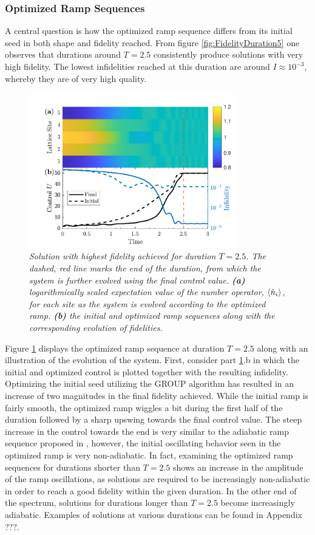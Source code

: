 \subsubsection{Optimized Ramp Sequences}
A central question is how the optimized ramp sequence differs from its initial seed in both shape and fidelity reached. From figure \ref{fig:FidelityDuration5} one observes that durations around $T = 2.5$ consistently produce solutions with very high fidelity. The lowest infidelities reached at this duration are around $I \approx 10^{-3}$, whereby they are of very high quality. 
\begin{figure}[h!]
    \centering
    \includegraphics[width=0.8\textwidth]{Figures/5part/ExtendedRampT25.pdf}
    \caption{\textit{Solution with highest fidelity achieved for duration $T = 2.5$. The dashed, red line marks the end of the duration, from which the system is further evolved using the final control value. \textbf{(a)} logarithmically scaled expectation value of the number operator, $\braket{\hat{n}_i}$, for each site as the system is evolved according to the optimized ramp. \textbf{(b)} the initial and optimized ramp sequences along with the corresponding evolution of fidelities.}}
    \label{fig:ExtendedRamp5}
\end{figure}
Figure \ref{fig:ExtendedRamp5} displays the optimized ramp sequence at duration $T = 2.5$ along with an illustration of the evolution of the system. First, consider part \ref{fig:ExtendedRamp5}.b in which the initial and optimized control is plotted together with the resulting infidelity. Optimizing the initial seed utilizing the GROUP algorithm has resulted in an increase of two magnitudes in the final fidelity achieved.
While the initial ramp is fairly smooth, the optimized ramp wiggles a bit during the first half of the duration followed by a sharp upswing towards the final control value. The steep increase in the control towards the end is very similar to the adiabatic ramp sequence proposed in \cite{Zakrzewski2009}, however, the initial oscillating behavior seen in the optimized ramp is very non-adiabatic. In fact, examining the optimized ramp sequences for durations shorter than $T = 2.5$ shows an increase in the amplitude of the ramp oscillations, as solutions are required to be increasingly non-adiabatic in order to reach a good fidelity within the given duration. In the other end of the spectrum, solutions for durations longer than $T = 2.5$ become increasingly adiabatic. Examples of solutions at various durations can be found in Appendix ???.\\
